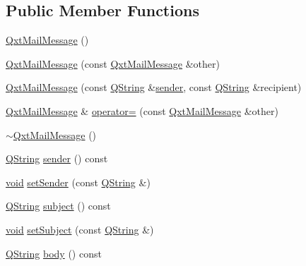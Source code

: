 \subsection*{Public Member Functions}
\begin{DoxyCompactItemize}
\item 
\hyperlink{class_qxt_mail_message_a22c670448ac0c633df34bd16ba248b90}{Qxt\-Mail\-Message} ()
\item 
\hyperlink{class_qxt_mail_message_ae80f2e344eb2371e882e48e65c74ca3f}{Qxt\-Mail\-Message} (const \hyperlink{class_qxt_mail_message}{Qxt\-Mail\-Message} \&other)
\item 
\hyperlink{class_qxt_mail_message_ae3027fd8b0ec041cdcd36ce3fae1a4ae}{Qxt\-Mail\-Message} (const \hyperlink{group___u_a_v_objects_plugin_gab9d252f49c333c94a72f97ce3105a32d}{Q\-String} \&\hyperlink{class_qxt_mail_message_a4f35925b4755c78ecf049b14717aafc4}{sender}, const \hyperlink{group___u_a_v_objects_plugin_gab9d252f49c333c94a72f97ce3105a32d}{Q\-String} \&recipient)
\item 
\hyperlink{class_qxt_mail_message}{Qxt\-Mail\-Message} \& \hyperlink{class_qxt_mail_message_a0a14985fd9ed37122c54b5edde3dbce7}{operator=} (const \hyperlink{class_qxt_mail_message}{Qxt\-Mail\-Message} \&other)
\item 
\hyperlink{class_qxt_mail_message_ae330a71aed17b8a051365d31ccbaa19a}{$\sim$\-Qxt\-Mail\-Message} ()
\item 
\hyperlink{group___u_a_v_objects_plugin_gab9d252f49c333c94a72f97ce3105a32d}{Q\-String} \hyperlink{class_qxt_mail_message_a4f35925b4755c78ecf049b14717aafc4}{sender} () const 
\item 
\hyperlink{group___u_a_v_objects_plugin_ga444cf2ff3f0ecbe028adce838d373f5c}{void} \hyperlink{class_qxt_mail_message_a3442e95354f4ae9e51810538b4fb7abd}{set\-Sender} (const \hyperlink{group___u_a_v_objects_plugin_gab9d252f49c333c94a72f97ce3105a32d}{Q\-String} \&)
\item 
\hyperlink{group___u_a_v_objects_plugin_gab9d252f49c333c94a72f97ce3105a32d}{Q\-String} \hyperlink{class_qxt_mail_message_a13abe36f22657fcf46df1d76c575ee66}{subject} () const 
\item 
\hyperlink{group___u_a_v_objects_plugin_ga444cf2ff3f0ecbe028adce838d373f5c}{void} \hyperlink{class_qxt_mail_message_a518edd4bac40d81681dde8c5ded5c4ce}{set\-Subject} (const \hyperlink{group___u_a_v_objects_plugin_gab9d252f49c333c94a72f97ce3105a32d}{Q\-String} \&)
\item 
\hyperlink{group___u_a_v_objects_plugin_gab9d252f49c333c94a72f97ce3105a32d}{Q\-String} \hyperlink{class_qxt_mail_message_a97791120fb0a938b3245ce891384a26c}{body} () const 

\end{DoxyCompactItemize}
